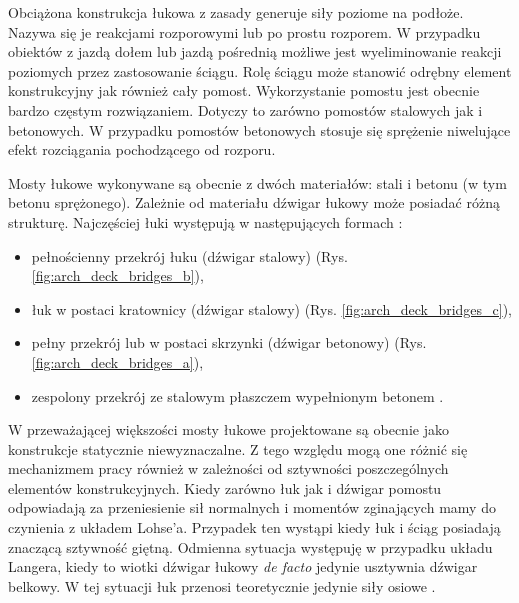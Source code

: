 Obciążona konstrukcja łukowa z zasady generuje siły poziome na podłoże. Nazywa się je reakcjami rozporowymi lub po prostu rozporem. W przypadku obiektów z jazdą dołem lub jazdą pośrednią możliwe jest wyeliminowanie reakcji poziomych przez zastosowanie ściągu. Rolę ściągu może stanowić odrębny element konstrukcyjny jak również cały pomost. Wykorzystanie pomostu jest obecnie bardzo częstym rozwiązaniem. Dotyczy to zarówno pomostów stalowych jak i betonowych. W przypadku pomostów betonowych stosuje się sprężenie niwelujące efekt rozciągania pochodzącego od rozporu.

Mosty łukowe wykonywane są obecnie z dwóch materiałów: stali i betonu (w tym betonu sprężonego). Zależnie od materiału dźwigar łukowy może posiadać różną strukturę. Najczęściej łuki występują w następujących formach \parencite{Cholewo1965}:
\begin{itemize}
	\item pełnościenny przekrój łuku (dźwigar stalowy) (Rys. \ref{fig:arch_deck_bridges_b}),
	\item łuk w postaci kratownicy (dźwigar stalowy) (Rys. \ref{fig:arch_deck_bridges_c}),
	\item pełny przekrój lub w postaci skrzynki (dźwigar betonowy) (Rys. \ref{fig:arch_deck_bridges_a}),
	\item zespolony przekrój ze stalowym płaszczem wypełnionym betonem  \parencite{Abramski2019}.
\end{itemize}

W przeważającej większości mosty łukowe projektowane są obecnie jako konstrukcje statycznie niewyznaczalne. Z tego względu mogą one różnić się mechanizmem pracy również w zależności od sztywności poszczególnych elementów konstrukcyjnych. Kiedy zarówno łuk jak i dźwigar pomostu odpowiadają za przeniesienie sił normalnych i momentów zginających mamy do czynienia z układem Lohse'a. Przypadek ten wystąpi kiedy łuk i ściąg posiadają znaczącą sztywność giętną. Odmienna sytuacja występuję w przypadku układu Langera, kiedy to wiotki dźwigar łukowy \textit{de facto} jedynie usztywnia dźwigar belkowy. W tej sytuacji łuk przenosi teoretycznie jedynie siły osiowe \parencite{Lin2017}. 

